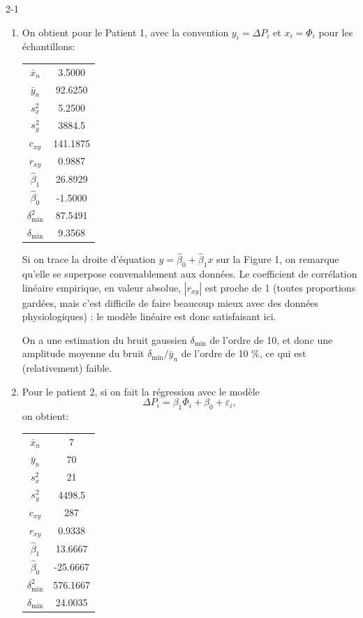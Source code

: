 \begin{corrige}{2-1}

\begin{enumerate}
 
 \item On obtient pour le Patient 1, avec la convention $y_i = \Delta P_i$ et $x_i = \Phi_i$ pour les échantillons:
 
\medskip 
 
\begin{center}
\begin{tabular}{|c|c|}\hline
    $\bar{x}_n$ & 3.5000\\
    $\bar{y}_n$ & 92.6250\\
    $s^2_x$ & 5.2500 \\
    $s^2_y$ & 3884.5 \\
    $c_{xy}$ & 141.1875\\ \hline
    $r_{xy}$ & 0.9887\\ \hline
    $\hat{\beta}_1$ & 26.8929\\
    $\hat{\beta}_0$ & -1.5000\\ \hline
    $\delta^2_{\mathrm{min}}$ & 87.5491\\
    $\delta_{\mathrm{min}}$ & 9.3568\\\hline
\end{tabular}
\end{center}    
    
Si on trace la droite d'équation $y = \hat{\beta}_0 + \hat{\beta}_1 x$ sur la Figure 1, on remarque qu'elle se superpose convenablement aux données. Le coefficient de corrélation linéaire empirique, en valeur absolue, $|r_{xy}|$ est proche de 1 (toutes proportions gardées, mais c'est difficile de faire beaucoup mieux avec des données physiologiques) : le modèle linéaire est donc satisfaisant ici. 

On a une estimation du bruit gaussien $\delta_{\mathrm{min}}$ de l'ordre de 10, et donc une amplitude moyenne du bruit $\delta_{\mathrm{min}} / \bar{y}_n$ de l'ordre de 10 \%, ce qui est (relativement) faible.

\item Pour le patient 2, si on fait la régression avec le modèle
\[
\Delta P_i = \beta_1 \Phi_i + \beta_0 + \varepsilon_i,
\]
on obtient:
\begin{center}
\begin{tabular}{|c|c|}\hline
    $\bar{x}_n$ & 7\\
    $\bar{y}_n$ & 70\\
    $s^2_x$ & 21 \\
    $s^2_y$ & 4498.5 \\
    $c_{xy}$ & 287\\ \hline
    $r_{xy}$ & 0.9338\\ \hline
    $\hat{\beta}_1$ & 13.6667\\
    $\hat{\beta}_0$ & -25.6667\\ \hline
    $\delta^2_{\mathrm{min}}$ & 576.1667\\
    $\delta_{\mathrm{min}}$ & 24.0035\\\hline
\end{tabular}
\end{center}    


\end{enumerate}
\end{corrige}
